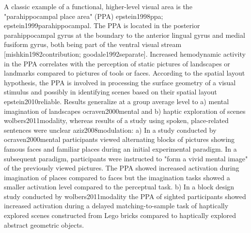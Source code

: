 \documentclass[english]{article}
\begin{document}
A classic example of a functional, higher-level visual area is the "parahippocampal place area" (PPA) {epstein1998ppa; epstein1999parahippocampal}. The PPA is located in the posterior parahippocampal gyrus at the boundary to the anterior lingual gyrus and medial fusiform gyrus, both being part of the ventral visual stream [mishkin1982contribution; goodale1992separate]. Increased hemodynamic activity in the PPA correlates with the perception of static pictures of landscapes or landmarks compared to pictures of tools or faces. According to the spatial layout hypothesis, the PPA is involved in processing the surface geometry of a visual stimulus and possibly in identifying scenes based on their spatial layout {epstein2010reliable}.
Results generalize at a group average level to a) mental imagination of landscapes {ocraven2000mental} and b) haptic exploration of scenes {wolbers2011modality},  whereas results of a study using spoken, place-related sentences were unclear  {aziz2008modulation}:
a) In a study conducted by {ocraven2000mental} participants viewed alternating blocks of pictures showing famous faces and familiar places during an initial experimental paradigm. In a subsequent paradigm, participants were instructed to "form a vivid mental image" of the previously viewed pictures. The PPA showed increased activation during imagination of places compared to faces but the imagination tasks showed a smaller activation level compared to the perceptual task.
b) In a block design study conducted by {wolbers2011modality} the PPA of sighted participants showed increased activation during a delayed matching-to-sample task of haptically explored scenes constructed from Lego bricks compared to haptically explored abstract geometric objects.
\end{document}
